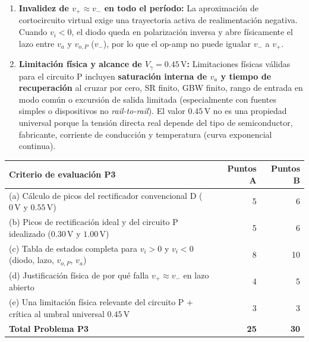 \documentclass[10pt, a4paper]{article}
\begin{document}
\begin{enumerate}
\begin{center}
\begin{tabularx}{\textwidth}{@{}c c c l X@{}}
            \bottomrule
        \end{tabularx}
    \end{center}
    \item \textbf{Invalidez de $v_+ \approx v_-$ en todo el período:} La aproximación de cortocircuito virtual exige una trayectoria activa de realimentación negativa. Cuando $v_i < 0$, el diodo queda en polarización inversa y abre físicamente el lazo entre $v_a$ y $v_{o,P}$ ($v_-$), por lo que el op-amp no puede igualar $v_-$ a $v_+$.
    \item \textbf{Limitación física y alcance de $V_\gamma = 0.45\,\mathrm{V}$:} Limitaciones físicas válidas para el circuito P incluyen \textbf{saturación interna de $v_a$ y tiempo de recuperación} al cruzar por cero, SR finito, GBW finito, rango de entrada en modo común o excursión de salida limitada (especialmente con fuentes simples o dispositivos no \textit{rail-to-rail}). El valor $0.45\,\mathrm{V}$ no es una propiedad universal porque la tensión directa real depende del tipo de semiconductor, fabricante, corriente de conducción y temperatura (curva exponencial continua).
\end{enumerate}

\begin{table}[htbp]
    \centering
    \footnotesize
    \begin{tabularx}{\textwidth}{@{}Xrr@{}}
        \toprule
        \textbf{Criterio de evaluación P3} & \textbf{Puntos A} & \textbf{Puntos B} \\
        \midrule
        (a) Cálculo de picos del rectificador convencional D ($0\,\mathrm{V}$ y $0.55\,\mathrm{V}$) & 5 & 6 \\
        (b) Picos de rectificación ideal y del circuito P idealizado ($0.30\,\mathrm{V}$ y $1.00\,\mathrm{V}$) & 5 & 6 \\
        (c) Tabla de estados completa para $v_i > 0$ y $v_i < 0$ (diodo, lazo, $v_{o,P}$, $v_a$) & 8 & 10 \\
        (d) Justificación física de por qué falla $v_+ \approx v_-$ en lazo abierto & 4 & 5 \\
        (e) Una limitación física relevante del circuito P + crítica al umbral universal $0.45\,\mathrm{V}$ & 3 & 3 \\
        \midrule
        \textbf{Total Problema P3} & \textbf{25} & \textbf{30} \\
        \bottomrule
    \end{tabularx}
\end{table}
\end{document}

